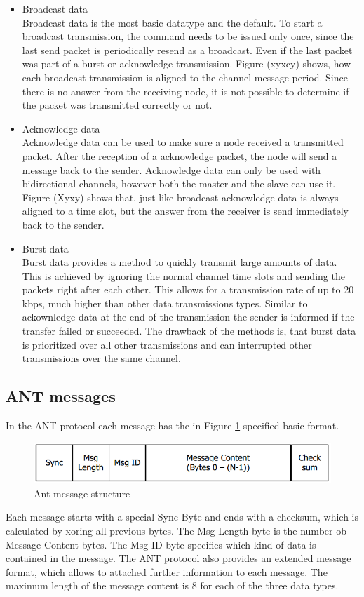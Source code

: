 \begin{itemize}
	\item{Broadcast data} \hfill \\ Broadcast data is the most basic datatype and the default. To start a broadcast transmission, the command needs to be issued only once, since the last send packet is periodically resend as a broadcast. Even if the last packet was part of a burst or acknowledge transmission. Figure (xyxcy) shows, how each broadcast transmission is aligned to the channel message period.	Since there is no answer from the receiving node, it is not possible to determine if the packet was transmitted correctly or not.

	\item{Acknowledge data} \hfill \\ Acknowledge data can be used to make sure a node received a transmitted packet. After the reception of a acknowledge packet, the node will send a message back to the sender. Acknowledge data can only be used with bidirectional channels, however both the master and the slave can use it. Figure (Xyxy) shows that, just like broadcast acknowledge data is always aligned to a time slot, but the answer from the receiver is send immediately back to the sender.
	
	\item{Burst data} \hfill \\ Burst data provides a method to quickly transmit large amounts of data. This is achieved by ignoring the normal channel time slots and sending the packets right after each other. This allows for a transmission rate of up to 20 kbps, much higher than other data transmissions types. Similar to ackownledge data at the end of the transmission the sender is informed if the transfer failed or succeeded. The drawback of the methods is, that burst data is prioritized over all other transmissions and can interrupted other transmissions over the same channel.
\end{itemize}

\subsection{ANT messages}
In the ANT protocol each message has the in Figure \ref{fig:antmsg} specified basic format.
\begin{figure}[h]
	\centering
	\includegraphics[scale=.75]{./pics/ANTmsg.png}
	\caption{Ant message structure}\label{fig:antmsg}
\end{figure}
Each message starts with a special Sync-Byte and ends with a checksum, which is calculated by xoring all previous bytes. The Msg Length byte is the number ob Message Content bytes. The Msg ID byte specifies which kind of data is contained in the message. The ANT protocol also provides an extended message format, which allows to attached further information to each message. The maximum length of the message content is 8 for each of the three data types.

